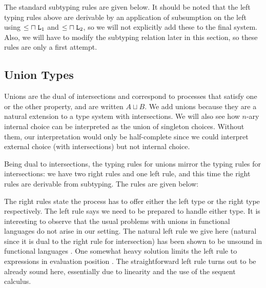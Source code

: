 \documentclass[submission,copyright,creativecommons]{eptcs}
\renewcommand{\intersect}{\mathrel{\sqcap}}
\renewcommand{\union}{\mathrel{\sqcup}}
\begin{document}
The standard subtyping rules are given below. It should be noted that the left typing rules above are derivable by an application of subsumption on the left using $\Sub{\intersect\Left_1}$ and $\Sub{\intersect\Left_2}$, so we will not explicitly add these to the final system. Also, we will have to modify the subtyping relation later in this section, so these rules are only a first attempt.



\subsection{Union Types}

Unions are the dual of intersections and correspond to processes that satisfy one or the other property, and are written $A \union B$. We add unions because they are a natural extension to a  type system with intersections. We will also see how $n$-ary internal choice can be interpreted as
the union of singleton choices. Without them, our interpretation would only be half-complete since we could interpret external choice (with intersections) but not internal choice.

Being dual to intersections, the typing rules for unions mirror the typing rules for intersections: we have two right rules and one left rule, and this time the right rules are derivable from subtyping. The rules are given below:


The right rules state the process has to offer either the left type or the right type respectively. The left rule says we need to be prepared to handle either type. It is interesting to observe that the usual problems with unions in functional languages do not arise in our setting. The natural left rule we give here (natural since it is dual to the right rule for intersection) has been shown to be unsound in functional languages \cite{Barbanera95ic}. One somewhat heavy solution limits the left rule to expressions in evaluation position \cite{DunfieldP04}. The straightforward left rule turns out to be already sound here, essentially due to linearity and the use of the sequent calculus.
\end{document}
